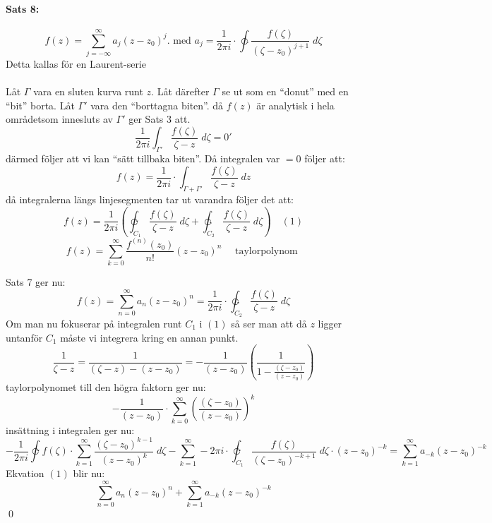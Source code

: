 \documentclass{article}
\begin{document}
\paragraph{Sats 8:}
\[
	f(z) = \sum_{j = - \infty}^\infty a_j (z - z_0)^j. \text{ med } a_j = \frac {1} {2 \pi i} \cdot \ointctrclockwise
		\frac {f(\zeta)} {(\zeta - z_0)^{j + 1}} \; d\zeta
\]
Detta kallas för en Laurent-serie\\
\\
Låt $\Gamma$ vara en sluten kurva runt $z$.
Låt därefter $\Gamma$ se ut som en ``donut'' med en ``bit'' borta.
Låt $\Gamma'$ vara den ``borttagna biten''. då $f(z)$ är analytisk i hela områdetsom innesluts av $\Gamma'$ ger Sats 3 att.
\[
	\frac {1} {2 \pi i} \int_{\Gamma'} \frac {f(\zeta)} {\zeta - z} \; d\zeta = 0'
\]
därmed följer att vi kan ``sätt tillbaka biten''. Då integralen var $= 0$ följer att:
\[
	f(z) = \frac {1} {2 \pi i} \cdot \int_{\Gamma + \Gamma'} \frac {f(\zeta)} {\zeta - z} \; dz
\]
då integralerna längs linjesegmenten tar ut varandra följer det att:
\[
	f(z) = \frac {1} {2 \pi i} \left ( \varointclockwise_{C_1} \frac {f(\zeta)} {\zeta - z} \; d\zeta + 
		\ointctrclockwise_{C_2} \frac {f(\zeta)} {\zeta - z} \; d\zeta \right ) \quad (1)
\]
\[
	f(z) = \sum_{k = 0}^\infty \frac {f^{(n)}(z_0)} {n!} (z - z_0)^n \quad \text{ taylorpolynom }
\]

Sats 7 ger nu:
\[
	f(z) = \sum_{n = 0}^\infty a_n (z - z_0)^n = \frac {1} {2 \pi i} \cdot \ointctrclockwise_{C_2} \frac 
		{f(\zeta)} {\zeta - z} \; d\zeta
\]
Om man nu fokuserar på integralen runt $C_1$ i $(1)$ så ser man att då $z$ ligger untanför $C_1$ 
måste vi integrera kring en annan punkt.
\[
	\frac {1} {\zeta - z} = \frac {1} {(\zeta - z) - (z - z_0)} = - \frac {1} {(z - z_0)}
		\left (
			\frac {1} {1 - \frac {(\zeta - z_0)} {(z - z_0)}}
		\right )
\]
taylorpolynomet till den högra faktorn ger nu:
\[
	- \frac {1} {(z - z_0)} \cdot \sum_{k = 0}^\infty
		\left (
			\frac {(\zeta - z_0)} {(z - z_0)}
		\right )^k
\]
insättning i integralen ger nu:
\[ %
	- \frac {1} {2 \pi i} \varointclockwise f(\zeta) \cdot \sum_{k = 1}^\infty \frac {(\zeta - z_0)^{k - 1}} {(z - z_0)^k} \; d\zeta
		- \sum_{k = 1}^\infty - 2 \pi i \cdot \varointclockwise_{C_1} \frac {f(\zeta)} {(\zeta - z_0)^{-k + 1}} \; d\zeta \cdot
			(z - z_0)^{-k} = \sum_{k = 1}^\infty a_{-k} (z - z_0)^{-k}
\] %
Ekvation $(1)$ blir nu:
\[
	\sum_{n = 0}^\infty a_n(z - z_0)^n + \sum_{k = 1}^\infty a_{-k}(z - z_0)^{-k}
\]
\hfill \qed
\end{document}
